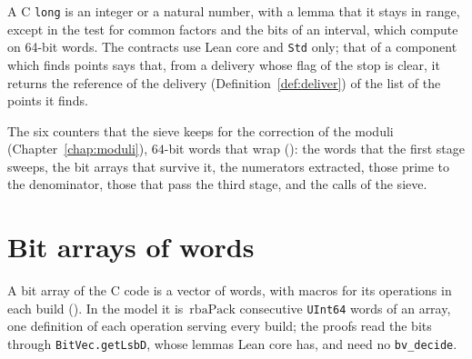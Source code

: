 A C \verb|long| is an integer or a natural number, with a lemma that it stays in range, except in
the test for common factors and the bits of an interval, which compute on 64-bit words. The
contracts use Lean core and \verb|Std| only; that of a component which finds points says that, from
a delivery whose flag of the stop is clear, it returns the reference of the delivery
(Definition~\ref{def:deliver}) of the list of the points it finds.

\begin{definition}\label{def:counters}
  \leanok
  The six counters that the sieve keeps for the correction of the moduli
  (Chapter~\ref{chap:moduli}), $64$-bit words that wrap (): the
  words that the first stage sweeps, the bit arrays that survive it, the numerators extracted, those
  prime to the denominator, those that pass the third stage, and the calls of the sieve.
\end{definition}

\section{Bit arrays of words}\label{sec:bitArrays}

A bit array of the C code is a vector of words, with macros for its operations in each build
(). In the model it is~$\mathrm{rbaPack}$ consecutive \verb|UInt64|
words of an array, one definition of each operation serving every build; the proofs read the bits
through \verb|BitVec.getLsbD|, whose lemmas Lean core has, and need no \verb|bv_decide|.

